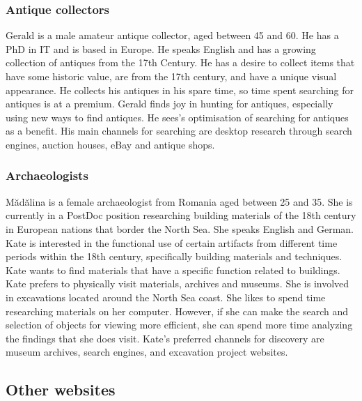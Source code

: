 \subsubsection{Antique collectors}

Gerald is a male amateur antique collector, aged between 45 and 60.  He has a PhD in IT and is based in Europe.  He speaks English and has a growing collection of antiques from the 17th Century.  He has a desire to collect items that have some historic value, are from the 17th century, and have a unique visual appearance.  He collects his antiques in his spare time, so time spent searching for antiques is at a premium.  Gerald finds joy in hunting for antiques, especially using new ways to find antiques.  He sees's optimisation of searching for antiques as a benefit.  His main channels for searching are desktop research through search engines, auction houses, eBay and antique shops.

\subsubsection{Archaeologists}

Mădălina is a female archaeologist from Romania aged between 25 and 35.  She is currently in a PostDoc position researching building materials of the 18th century in European nations that border the North Sea.  She speaks English and German.  Kate is interested in the functional use of certain artifacts from different time periods within the 18th century, specifically building materials and techniques. Kate wants to find materials that have a specific function related to buildings.  Kate prefers to physically visit materials, archives and museums.  She is involved in excavations located around the North Sea coast.  She likes to spend time researching materials on her computer.  However, if she can make the search and selection of objects for viewing more efficient, she can spend more time analyzing the findings that she does visit.  Kate's preferred channels for discovery are museum archives, search engines, and excavation project websites.

\subsection{Other websites}

